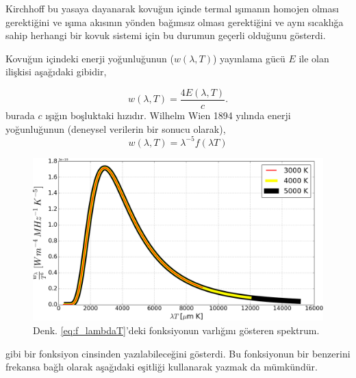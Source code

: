 \documentclass[a4paper,12pt, twoside]{article}
\begin{document}


Kirchhoff bu yasaya dayanarak kovuğun içinde termal ışımanın homojen olması gerektiğini ve ışıma akısının yönden bağımsız olması gerektiğini ve aynı sıcaklığa sahip herhangi bir kovuk sistemi için bu durumun geçerli olduğunu gösterdi.

Kovuğun içindeki enerji yoğunluğunun ($w(\lambda,T)$) yayınlama gücü $E$ ile olan ilişkisi aşağıdaki gibidir,
 
\begin{equation}
\label{eq:emissiveDensity}
w(\lambda,T) = \frac{4 E(\lambda,T)}{c}.
\end{equation}
burada $c$ ışığın boşluktaki hızıdır. Wilhelm Wien 1894 yılında enerji yoğunluğunun (deneysel verilerin bir sonucu olarak), 
\begin{equation}
\label{eq:f_lambdaT}
w(\lambda,T) = \lambda^{-5} f(\lambda T)
\end{equation}
\begin{figure}[hbtp]
\center
\includegraphics[scale=.4]{blackbody_spect_vs_lambdaT.png}
\caption{Denk. \ref{eq:f_lambdaT}'deki fonksiyonun varlığını gösteren spektrum.}
\label{fig:karaSpektrum_lamdaT}
\end{figure}
gibi bir fonksiyon cinsinden yazılabileceğini gösterdi. Bu fonksiyonun bir benzerini frekansa bağlı olarak aşağıdaki eşitliği kullanarak yazmak da mümkündür.
\end{document}
